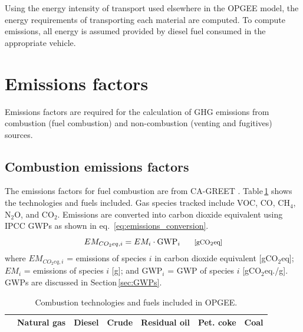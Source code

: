 \documentclass[11pt]{report}
\newcommand{\marg}[1]{{\footnotesize\textit{\textcolor{stanford}{'#1'}}}}
\newcommand{\marginnote}[1]{\marginpar{\marg{#1}}}
\begin{document}
{{{{Using the energy intensity of transport used elsewhere in the OPGEE model, the energy requirements of transporting each material are computed. To compute emissions, all energy is assumed provided by diesel fuel \marginnote{Embodied Emissions 6.4-5} consumed in the appropriate vehicle. 




\section{Emissions factors} \label{sec:emissions_factors}

Emissions factors are required for the calculation of GHG emissions from combustion (fuel combustion) and non-combustion (venting and fugitives) sources. 

\subsection{Combustion emissions factors}

The emissions factors for fuel combustion are from CA-GREET \cite{Wang2009}. Table\,\ref{tab:combustion_EF} shows the technologies and fuels included. Gas species tracked include VOC, CO, CH$_{4}$, N$_{2}$O, and CO$_{2}$. Emissions are converted into carbon dioxide equivalent using IPCC GWPs \cite{IPCC2007} as shown in eq.\ \eqref{eq:emissions_conversion}. 
\begin{equation} \label{eq:emissions_conversion}
EM_{CO_{2}eq,i} = EM_{i} \cdot \text{GWP}_{i} \footnotesize{\quad\quad\text{[gCO$_{2}$eq]}}
\end{equation} 
where $EM_{CO_{2}eq,i}$ = emissions of species $i$ in carbon dioxide equivalent [gCO$_{2}$eq]; $EM_{i}$ = emissions of species $i$ [g]; and GWP$_{i}$ = GWP of species $i$ [gCO$_2$eq./g]. GWPs are discussed in Section\,\ref{sec:GWPs}.


\begin{table}
\begin{scriptsize}
\caption{Combustion technologies and fuels included in OPGEE.}
\label{tab:combustion_EF}
\begin{threeparttable}
\begin{tabular*}{1\columnwidth}{p{}p{}p{}p{}p{}p{}p{}}
\toprule
& Natural gas & Diesel & Crude & Residual oil & Pet. coke & Coal \\
\midrule


\end{tabular*}
\end{threeparttable}
\end{scriptsize}
\end{table}}}}}
\end{document}
